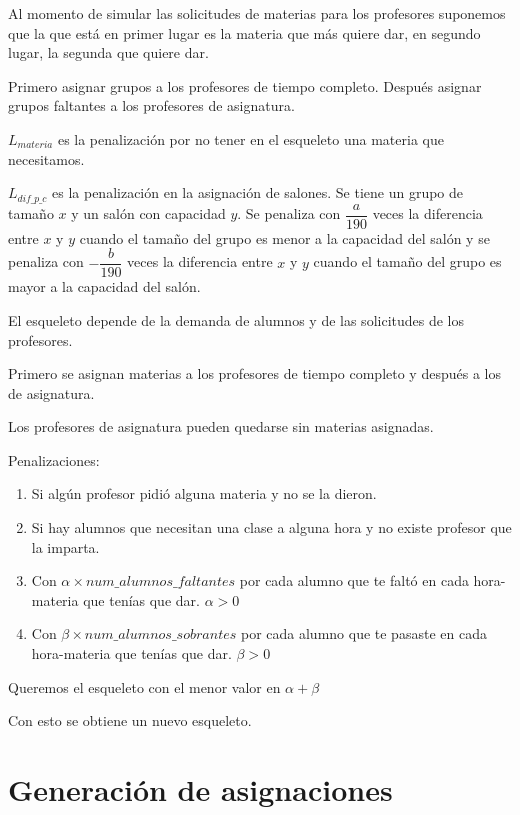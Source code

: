 Al momento de simular las solicitudes de materias para los profesores suponemos que la que está en primer lugar es la materia que más quiere dar, en segundo lugar, la segunda que quiere dar.

Primero asignar grupos a los profesores de tiempo completo. Después asignar grupos faltantes a los profesores de asignatura.

$L_{materia}$ es la penalización por no tener en el esqueleto una materia que necesitamos.

$L_{dif\_p\_c}$ es la penalización en la asignación de salones. Se tiene un grupo de tamaño $x$ y un salón con capacidad $y$. Se penaliza con $\dfrac{a}{190}$ veces la diferencia entre $x$ y $y$ cuando el tamaño del grupo es menor a la capacidad del salón y se penaliza con $-\dfrac{b}{190}$ veces la diferencia entre $x$ y $y$ cuando el tamaño del grupo es mayor a la capacidad del salón.

El esqueleto depende de la demanda de alumnos y de las solicitudes de los profesores.

Primero se asignan materias a los profesores de tiempo completo y después a los de asignatura.

Los profesores de asignatura pueden quedarse sin materias asignadas.

Penalizaciones:

\begin{enumerate}
\item Si algún profesor pidió alguna materia y no se la dieron.

\item Si hay alumnos que necesitan una clase a alguna hora y no existe profesor que la imparta.

\item Con $\alpha \times num\_alumnos\_faltantes$ por cada alumno que te faltó en cada hora-materia que tenías que dar. $\alpha > 0$

\item Con $\beta \times num\_alumnos\_sobrantes$ por cada alumno que te pasaste en cada hora-materia que tenías que dar. $\beta > 0$

\end{enumerate}

Queremos el esqueleto con el menor valor en $\alpha + \beta$

Con esto se obtiene un nuevo esqueleto.


\section{Generación de asignaciones}

